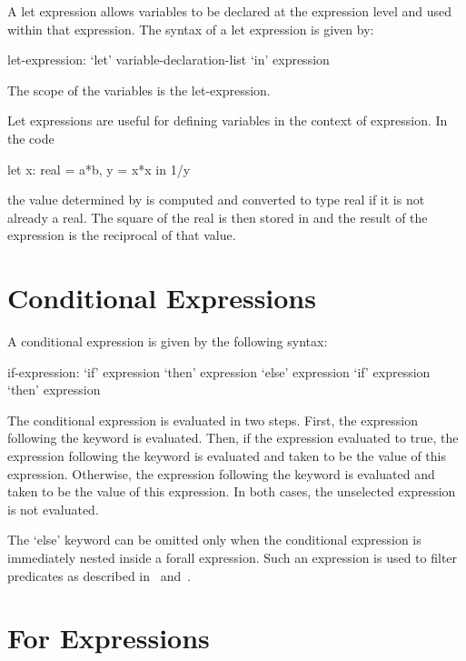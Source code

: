 A let expression allows variables to be declared at the expression
level and used within that expression.  The syntax of a let expression
is given by:
\begin{syntax}
let-expression:
  `let' variable-declaration-list `in' expression
\end{syntax}
The scope of the variables is the let-expression.
\begin{example}
Let expressions are useful for defining variables in the context of
expression.  In the code
\begin{chapel}
  let x: real = a*b, y = x*x in 1/y
\end{chapel}
the value determined by  is computed and converted to type
real if it is not already a real.  The square of the real is then
stored in  and the result of the expression is the reciprocal
of that value.
\end{example}

\section{Conditional Expressions}
\label{Conditional_Expressions}

A conditional expression is given by the following syntax:
\begin{syntax}
if-expression:
  `if' expression `then' expression `else' expression
  `if' expression `then' expression
\end{syntax}
The conditional expression is evaluated in two steps.  First, the
expression following the  keyword is evaluated.  Then, if the
expression evaluated to true, the expression following the 
keyword is evaluated and taken to be the value of this expression.
Otherwise, the expression following the  keyword is
evaluated and taken to be the value of this expression.  In both
cases, the unselected expression is not evaluated.

The `else' keyword can be omitted only when the conditional expression
is immediately nested inside a forall expression.  Such an expression
is used to filter predicates as described
in~ and~.

\section{For Expressions}
\label{For_Expressions}

